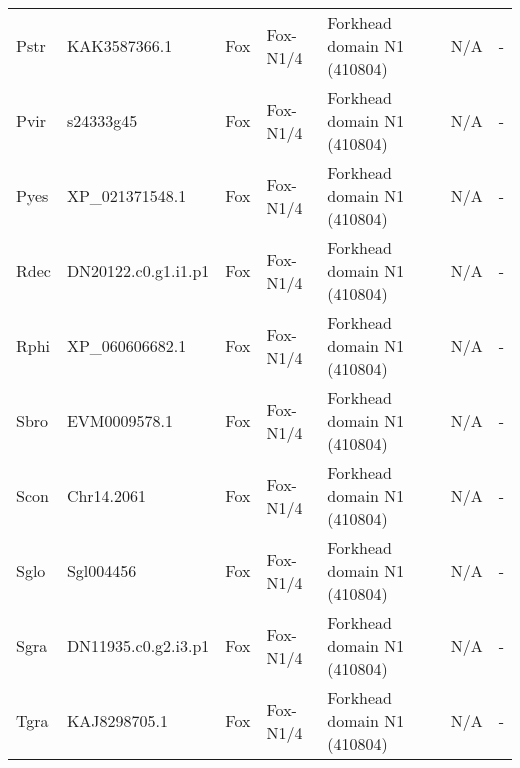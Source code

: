 \documentclass[../main.tex]{subfiles}
\begin{document}
\begin{landscape}
\begin{longtable}{lllllll}
		Pstr           & KAK3587366.1          & Fox            & Fox-N1/4            & Forkhead domain N1 (410804)                 & N/A                                                                    & -                    \\
		Pvir           & s24333g45             & Fox            & Fox-N1/4            & Forkhead domain N1 (410804)                 & N/A                                                                    & -                    \\
		Pyes           & XP\_021371548.1       & Fox            & Fox-N1/4            & Forkhead domain N1 (410804)                 & N/A                                                                    & -                    \\
		Rdec           & DN20122.c0.g1.i1.p1   & Fox            & Fox-N1/4            & Forkhead domain N1 (410804)                 & N/A                                                                    & -                    \\
		Rphi           & XP\_060606682.1       & Fox            & Fox-N1/4            & Forkhead domain N1 (410804)                 & N/A                                                                    & -                    \\
		Sbro           & EVM0009578.1          & Fox            & Fox-N1/4            & Forkhead domain N1 (410804)                 & N/A                                                                    & -                    \\
		Scon           & Chr14.2061            & Fox            & Fox-N1/4            & Forkhead domain N1 (410804)                 & N/A                                                                    & -                    \\
		Sglo           & Sgl004456             & Fox            & Fox-N1/4            & Forkhead domain N1 (410804)                 & N/A                                                                    & -                    \\
		Sgra           & DN11935.c0.g2.i3.p1   & Fox            & Fox-N1/4            & Forkhead domain N1 (410804)                 & N/A                                                                    & -                    \\
		Tgra           & KAJ8298705.1          & Fox            & Fox-N1/4            & Forkhead domain N1 (410804)                 & N/A                                                                    & -                    \\

\end{longtable}
\end{landscape}
\end{document}
